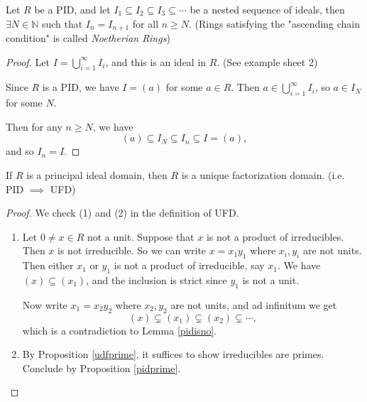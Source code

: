 \begin{lemma}
    \label{pidisno}
    Let \(R\) be a PID, and let \(I_1 \subseteq I_2 \subseteq I_3 \subseteq \cdots\) be a nested sequence of ideals, then \(\exists N \in \mathbb{N}\) such that \(I_n = I_{n+1}\) for all \(n \geq N\). (Rings satisfying the "ascending chain condition" is called \textit{Noetherian Rings})
\end{lemma}
\begin{proof}
    Let \(I = \bigcup_{i=1}^\infty I_i\), and this is an ideal in \(R\). (See example sheet 2)

    Since \(R\) is a PID, we have \(I = (a)\) for some \(a \in R\). Then \(a \in \bigcup_{i=1}^\infty I_i\), so \(a \in I_{N}\) for some \(N\).

    Then for any \(n \geq N\), we have
    \[
        (a) \subseteq I_N \subseteq I_n \subseteq I = (a),
    \]
    and so \(I_n = I\).
\end{proof}
\begin{theorem}
    If \(R\) is a principal ideal domain, then \(R\) is a unique factorization domain. (i.e. PID \(\implies\) UFD)
\end{theorem}
\begin{proof}
    We check (1) and (2) in the definition of UFD.
    \begin{enumerate}
        \item Let \(0 \neq x \in R\) not a unit. Suppose that \(x\) is not a product of irreducibles. Then \(x\) is not irreducible. So we can write \(x = x_{1}y_1\) where \(x_i, y_i\) are not units. Then either \(x_1\) or \(y_1\) is not a product of irreducible, say \(x_1\). We have \((x) \subseteq (x_1)\), and the inclusion is strict since \(y_1\) is not a unit.

        Now write \(x_1 = x_2 y_2\) where \(x_2, y_2\) are not units, and ad infinitum we get
        \[
            (x)\subsetneq (x_1) \subsetneq (x_2) \subsetneq \cdots,
        \]
        which is a contradiction to Lemma \eqref{pidisno}.
        \item By Proposition \eqref{udfprime}, it suffices to show irreducibles are primes. Conclude by Proposition \eqref{pidprime}.
    \end{enumerate}
\end{proof}
